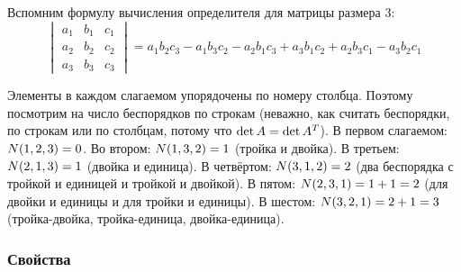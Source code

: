 \documentclass[a4paper,12pt]{article}
\theoremstyle{remark}
\begin{document}
  \begin{example}
    Вспомним формулу вычисления определителя для матрицы размера $3$:
    \begin{equation*}
      \begin{vmatrix}
        a_1 & b_1 & c_1\\
        a_2 & b_2 & c_2\\
        a_3 & b_3 & c_3
      \end{vmatrix}
        = a_1 b_2 c_3 - a_1 b_3 c_2 - a_2 b_1 c_3 + a_3 b_1 c_2 + a_2 b_3 c_1 - a_3 b_2 c_1
    \end{equation*}
    
    Элементы в каждом слагаемом упорядочены по номеру столбца.
    Поэтому посмотрим на число беспорядков по строкам (неважно, как считать беспорядки, по строкам или по столбцам, потому что $\det A \hm= \det A^T$).
    В первом слагаемом: $N(1, 2, 3) \hm= 0$.
    Во втором: $N(1, 3, 2) \hm= 1$ (тройка и двойка).
    В третьем: $N(2, 1, 3) \hm= 1$ (двойка и единица).
    В четвёртом: $N(3, 1, 2) \hm= 2$ (два беспорядка с тройкой и единицей и тройкой и двойкой).
    В пятом: $N(2, 3, 1) \hm= 1 \hm+ 1 \hm= 2$ (для двойки и единицы и для тройки и единицы).
    В шестом: $N(3, 2, 1) \hm= 2 \hm+ 1 \hm= 3$ (тройка-двойка, тройка-единица, двойка-единица).
  \end{example}
  
  
  \subsubsection{Свойства}
  
\end{document}
